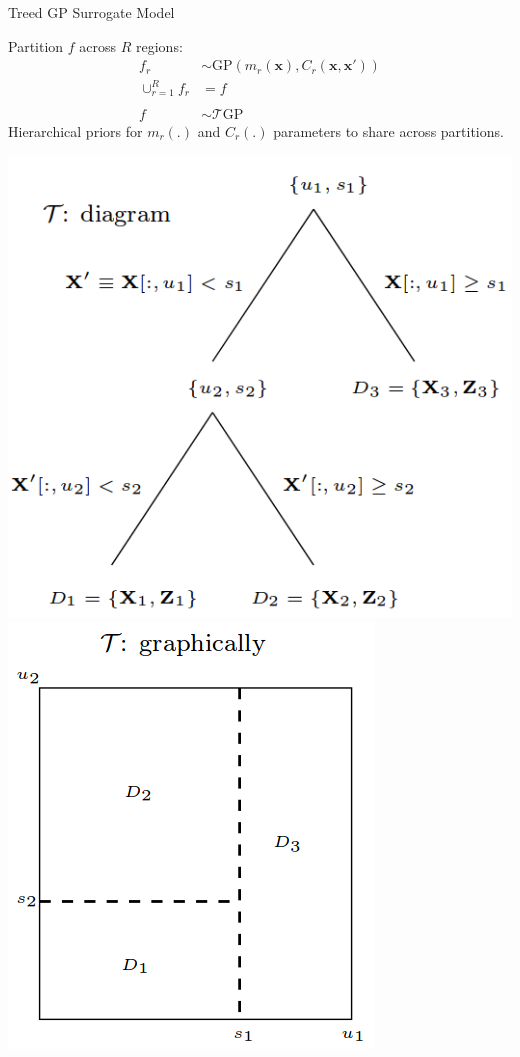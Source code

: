 \documentclass[ xcolor = pdftex, dvipsnames, table ]{beamer}
\begin{document}
%
%

\begin{frame}{Treed GP Surrogate Model}
\begin{minipage}[h!]{0.55\textwidth}
\vspace{0.5cm}
Partition $f$ across $R$ regions:
\begin{align*}
f_{r} &\sim \text{GP}\left( m_{r}(\bm{x}), C_{r}(\bm{x}, \bm{x'})\right)\\
\cup_{r=1}^{R} f_r &= f\\
&\\
f &\sim \mathcal{T}\text{GP}
\end{align*}
Hierarchical priors for $m_{r}(.)$ and $C_{r}(.)$ parameters to share across partitions.
\end{minipage} 
\begin{minipage}[h!]{0.43\textwidth}
\begin{center}
\includegraphics[height=0.5\textwidth]{tree.png}\\
\includegraphics[height=0.7\textwidth]{parts.png}
\end{center}
\end{minipage}


\end{frame}
\end{document}
